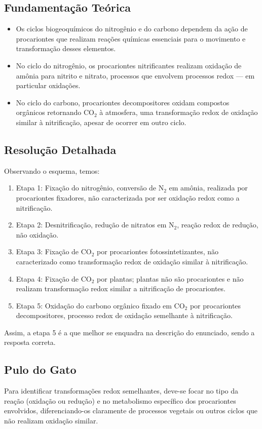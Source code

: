 \documentclass{article}
\begin{document}
\subsection*{Fundamentação Teórica}
\begin{itemize}
  \item Os ciclos biogeoquímicos do nitrogênio e do carbono dependem da ação de procariontes que realizam reações químicas essenciais para o movimento e transformação desses elementos.
  \item No ciclo do nitrogênio, os procariontes nitrificantes realizam oxidação de amônia para nitrito e nitrato, processos que envolvem processos redox — em particular oxidações.
  \item No ciclo do carbono, procariontes decompositores oxidam compostos orgânicos retornando CO$_2$ à atmosfera, uma transformação redox de oxidação similar à nitrificação, apesar de ocorrer em outro ciclo.
\end{itemize}

\subsection*{Resolução Detalhada}
Observando o esquema, temos:
\begin{enumerate}
  \item Etapa 1: Fixação do nitrogênio, conversão de N$_2$ em amônia, realizada por procariontes fixadores, não caracterizada por ser oxidação redox como a nitrificação.
  \item Etapa 2: Desnitrificação, redução de nitratos em N$_2$, reação redox de redução, não oxidação.
  \item Etapa 3: Fixação de CO$_2$ por procariontes fotossintetizantes, não caracterizado como transformação redox de oxidação similar à nitrificação.
  \item Etapa 4: Fixação de CO$_2$ por plantas; plantas não são procariontes e não realizam transformação redox similar a nitrificação de procariontes.
  \item Etapa 5: Oxidação do carbono orgânico fixado em CO$_2$ por procariontes decompositores, processo redox de oxidação semelhante à nitrificação.
\end{enumerate}

Assim, a etapa 5 é a que melhor se enquadra na descrição do enunciado, sendo a resposta correta.

\subsection*{Pulo do Gato}
Para identificar transformações redox semelhantes, deve-se focar no tipo da reação (oxidação ou redução) e no metabolismo específico dos procariontes envolvidos, diferenciando-os claramente de processos vegetais ou outros ciclos que não realizam oxidação similar.
\end{document}
